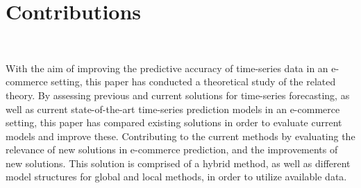 
\section{Contributions}~\label{cont}
\label{section:Discussion:Contributions}


With the aim of improving the predictive accuracy of time-series data in an e-commerce setting,
this paper has conducted a theoretical study of the related theory.
By assessing previous and current solutions for time-series forecasting, as well as current state-of-the-art time-series prediction models in an e-commerce setting,
this paper has compared existing solutions in order to evaluate current models and improve these.
Contributing to the current methods by evaluating the relevance of new solutions in e-commerce prediction,
and the improvements of new solutions.
This solution is comprised of a hybrid method, as well as different model structures for global and local methods,
in order to utilize available data.




\iffalse
  What are the main contributions made to the field and how significant are these contribution.
\fi
